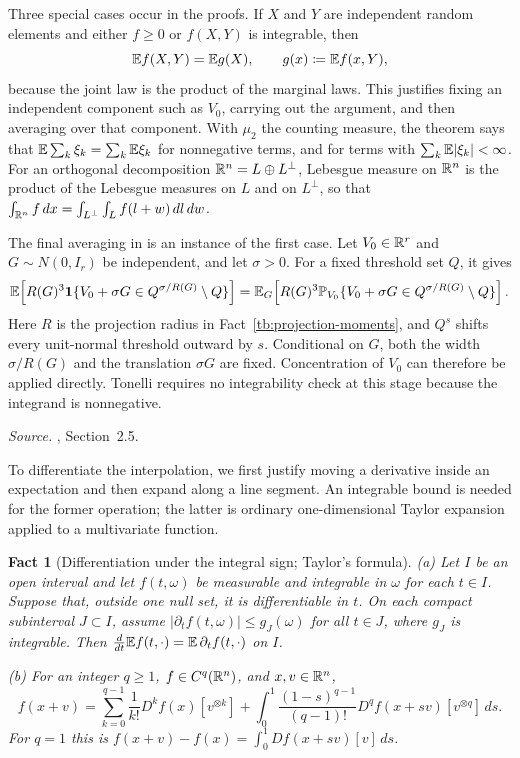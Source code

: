 \documentclass[11pt,letterpaper]{article}
\theoremstyle{plain}
\newtheorem{fact}{Fact}[section]
\begin{document}
Three special cases occur in the proofs. If \(X\) and \(Y\) are
independent random elements and either \(f\ge0\) or \(f(X,Y)\) is
integrable, then
\[
 \mathbb E f(X,Y)=\mathbb E g(X),\qquad g(x)\coloneqq \mathbb E f(x,Y),
\]
because the joint law is the product of the marginal laws. This justifies
fixing an independent component such as \(V_0\), carrying out the argument,
and then averaging over that component. With
\(\mu_2\) the counting measure, the theorem says that
\(\mathbb E\sum_k\xi_k=\sum_k\mathbb E\xi_k\) for nonnegative terms, and for terms with
\(\sum_k\mathbb E|\xi_k|<\infty\). For an orthogonal decomposition
\(\mathbb R^n=L\oplus L^\perp\), Lebesgue measure on \(\mathbb R^n\) is the product of the
Lebesgue measures on \(L\) and on \(L^\perp\), so that
\(\int_{\mathbb R^n}f\,dx=\int_{L^\perp}\int_Lf(l+w)\,dl\,dw\).

The final averaging in  is an
instance of the first case. Let \(V_0\in\mathbb R^r\) and
\(G\sim N(0,I_r)\) be independent, and let \(\sigma>0\).
For a fixed threshold set \(Q\), it gives
\[
 \mathbb E\!\left[R(G)^3\mathbf 1\{V_0+\sigma G\in
                   Q^{\sigma/R(G)}\setminus Q\}\right]
 =\mathbb E_G\!\left[R(G)^3\mathbb P_{V_0}\{V_0+\sigma G\in
                   Q^{\sigma/R(G)}\setminus Q\}\right].
\]
Here \(R\) is the projection radius in
Fact~\ref{tb:projection-moments}, and \(Q^s\) shifts every
unit-normal threshold outward by \(s\). Conditional on \(G\), both
the width \(\sigma/R(G)\) and the translation \(\sigma G\) are fixed.
Concentration of \(V_0\) can therefore be applied directly. Tonelli
requires no integrability check at this stage because the integrand
is nonnegative.

\emph{Source.} , Section~2.5.

To differentiate the interpolation, we first justify moving a derivative
inside an expectation and then expand along a line segment. An integrable
bound is needed for the former operation; the latter is ordinary
one-dimensional Taylor expansion applied to a multivariate function.

\begin{fact}[Differentiation under the integral sign; Taylor's formula]
\label{tb:taylor}
(a) Let \(I\) be an open interval and let \(f(t,\omega)\) be
measurable and integrable in \(\omega\) for each \(t\in I\).
Suppose that, outside one null set, it is differentiable in \(t\).
On each compact subinterval \(J\subset I\), assume
\(|\partial_t f(t,\omega)|\le g_J(\omega)\) for all \(t\in J\),
where \(g_J\) is integrable. Then \(\frac d{dt}\mathbb E f(t,\cdot)
=\mathbb E\,\partial_t f(t,\cdot)\) on \(I\).

(b) For an integer \(q\ge1\), \(f\in C^q(\mathbb R^n)\), and \(x,v\in\mathbb R^n\),
\[
 f(x+v)=\sum_{k=0}^{q-1}\frac1{k!}D^kf(x)[v^{\otimes k}]
 +\int_0^1\frac{(1-s)^{q-1}}{(q-1)!}D^qf(x+sv)[v^{\otimes q}]\,ds.
\]
For \(q=1\) this is \(f(x+v)-f(x)=\int_0^1Df(x+sv)[v]\,ds\).
\end{fact}
\end{document}
